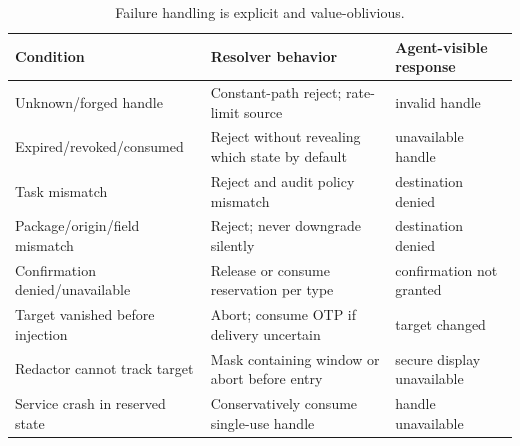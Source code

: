 \begin{table}[htbp]
\centering
\caption{Failure handling is explicit and value-oblivious.}
\label{tab:failures}
\footnotesize
\renewcommand{\arraystretch}{1.18}
\begin{tabularx}{\textwidth}{@{}>{\raggedright\arraybackslash}p{3.2cm}>{\raggedright\arraybackslash}X>{\raggedright\arraybackslash}p{3.1cm}@{}}
\toprule
Condition & Resolver behavior & Agent-visible response \\
\midrule
Unknown/forged handle & Constant-path reject; rate-limit source & invalid handle \\
Expired/\allowbreak revoked/\allowbreak consumed & Reject without revealing which state by default & unavailable handle \\
Task mismatch & Reject and audit policy mismatch & destination denied \\
Package/\allowbreak origin/\allowbreak field mismatch & Reject; never downgrade silently & destination denied \\
Confirmation denied/\allowbreak unavailable & Release or consume reservation per type & confirmation not granted \\
Target vanished before injection & Abort; consume OTP if delivery uncertain & target changed \\
Redactor cannot track target & Mask containing window or abort before entry & secure display unavailable \\
Service crash in reserved state & Conservatively consume single-use handle & handle unavailable \\
\bottomrule
\end{tabularx}
\end{table}
